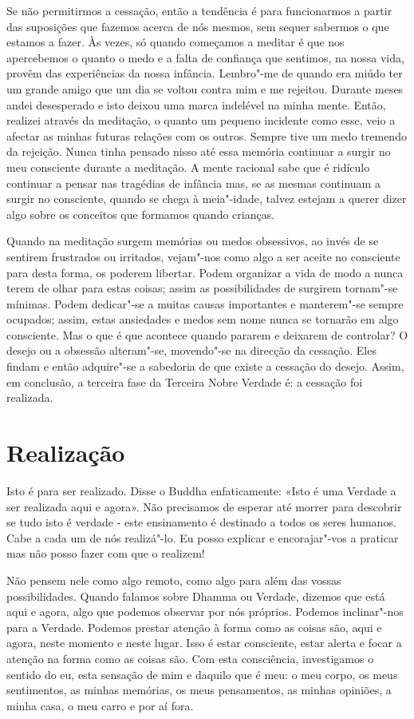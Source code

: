 Se não permitirmos a cessação, então a tendência é para funcionarmos a partir das
suposições que fazemos acerca de nós mesmos, sem sequer sabermos o que estamos a
fazer. Às vezes, só quando começamos a meditar é que nos apercebemos o quanto o
medo e a falta de confiança que sentimos, na nossa vida, provêm das experiências
da nossa infância. Lembro"-me de quando era miúdo ter um grande amigo que um dia
se voltou contra mim e me rejeitou. Durante meses andei desesperado e isto
deixou uma marca indelével na minha mente. Então, realizei através da meditação,
o quanto um pequeno incidente como esse, veio a afectar as minhas futuras
relações com os outros. Sempre tive um medo tremendo da rejeição. Nunca tinha
pensado nisso até essa memória continuar a surgir no meu consciente durante a
meditação. A mente racional sabe que é ridículo continuar a pensar nas tragédias
de infância mas, se as mesmas continuam a surgir no consciente, quando se chega
à meia"-idade, talvez estejam a querer dizer algo sobre os conceitos que formamos
quando crianças.

Quando na meditação surgem memórias ou medos obsessivos, ao invés de se sentirem
frustrados ou irritados, vejam"-nos como algo a ser aceite no consciente para
desta forma, os poderem libertar. Podem organizar a vida de modo a nunca terem
de olhar para estas coisas; assim as possibilidades de surgirem tornam"-se
mínimas. Podem dedicar"-se a muitas causas importantes e manterem"-se sempre
ocupados; assim, estas ansiedades e medos sem nome nunca se tornarão em algo
consciente. Mas o que é que acontece quando pararem e deixarem de controlar? O
desejo ou a obsessão alteram"-se, movendo"-se na direcção da cessação. Eles findam 
e então adquire"-se a sabedoria de que existe a cessação do desejo. Assim, em 
conclusão, a terceira fase da Terceira Nobre Verdade é: a cessação foi realizada.

\section{Realização}

Isto é para ser realizado. Disse o Buddha enfaticamente: «Isto é uma Verdade a
ser realizada aqui e agora». Não precisamos de esperar até morrer para descobrir
se tudo isto é verdade - este ensinamento é destinado a todos os seres humanos.
Cabe a cada um de nós realizá"-lo. Eu posso explicar e encorajar"-vos a praticar
mas não posso fazer com que o realizem!

Não pensem nele como algo remoto, como algo para além das vossas possibilidades. Quando
falamos sobre Dhamma ou Verdade, dizemos que está aqui e agora, algo que podemos
observar por nós próprios. Podemos inclinar"-nos para a Verdade. Podemos prestar
atenção à forma como as coisas são, aqui e agora, neste momento e neste lugar.
Isso é estar consciente, estar alerta e focar a atenção na forma como as coisas
são. Com esta consciência, investigamos o sentido do eu, esta sensação de mim
e daquilo que é meu: o meu corpo, os meus sentimentos, as minhas memórias, os
meus pensamentos, as minhas opiniões, a minha casa, o meu carro e por aí fora.

